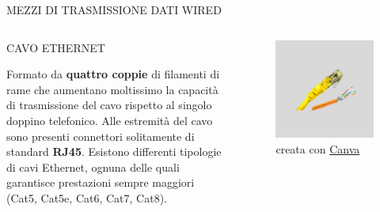 \documentclass[aspectratio=1610]{beamer}
\begin{document}
\begin{frame}{MEZZI DI TRASMISSIONE DATI WIRED}
    \begin{columns}
        \begin{alertblock}{CAVO ETHERNET}
            \begin{minipage}{0.97\linewidth}
                \justifying
                Formato da \textbf{quattro coppie} di filamenti di rame che aumentano moltissimo 
                la capacità di trasmissione del cavo rispetto al singolo doppino telefonico. 
                Alle estremità del cavo sono presenti connettori solitamente di standard \textbf{RJ45}. 
                Esistono differenti tipologie di cavi Ethernet, ognuna delle quali garantisce prestazioni 
                sempre maggiori (Cat5, Cat5e, Cat6, Cat7, Cat8).
            \end{minipage}
        \end{alertblock}
           \begin{figure}
               \includegraphics[width=\linewidth]{img/cavo_ethernet.png}
               \caption{{creata con \href{https://www.canva.com/}{Canva}}}
           \end{figure}
    \end{columns}
\end{frame}
\end{document}
